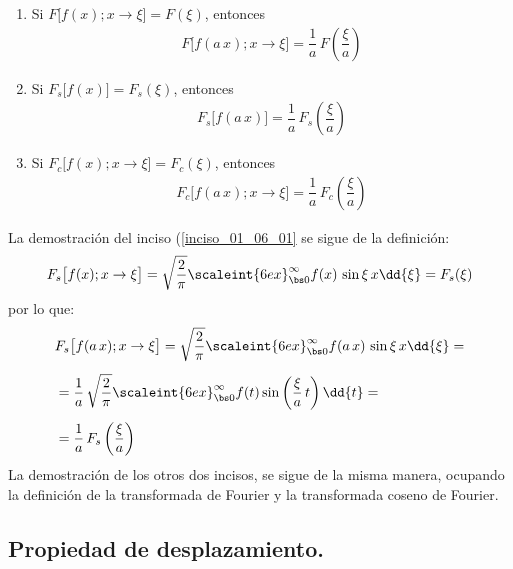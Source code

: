 \begin{enumerate}[\thesubsection .1)]
\item Si $F \big[ f(x); x \to \xi \big] = F(\xi)$, entonces
\begin{align*}
F \big[ f(a \, x); x \to \xi \big] = \dfrac{1}{a} \, F \left( \dfrac{\xi}{a} \right)
\end{align*}
\item \label{inciso_01_06_01} Si $F_{s} \big[ f(x) \big] = F_{s}(\xi)$, entonces
\begin{align*}
F_{s} \big[f(a \, x) \big] = \dfrac{1}{a} \, F_{s} \left( \dfrac{\xi}{a} \right)
\end{align*}
\item Si $F_{c} \big[ f(x); x \to \xi \big] = F_{c}(\xi)$, entonces
\begin{align*}
F_{c} \big[ f(a \, x); x \to \xi \big] = \dfrac{1}{a} \, F_{c} \left( \dfrac{\xi}{a} \right)
\end{align*}
\end{enumerate}
La demostración del inciso (\ref{inciso_01_06_01} se sigue de la definición:
\begin{align*}
F_{s} \big[ f(x); x \to \xi \big] = \sqrt{\dfrac{2}{\pi}} \scaleint{6ex}_{\bs 0}^{\infty} f(x) \, \sin \xi \, x \dd{\xi} = F_{s} (\xi)
\end{align*}
por lo que:
\begin{align*}
&F_{s} \big[ f(a \, x); x \to \xi \big] = \sqrt{\dfrac{2}{\pi}} \scaleint{6ex}_{\bs 0}^{\infty} f(a \, x) \, \sin \xi \, x \dd{\xi} = \\[0.5em]
&= \dfrac{1}{a} \, \sqrt{\dfrac{2}{\pi}} \scaleint{6ex}_{\bs 0}^{\infty} f(t) \sin \left( \dfrac{\xi}{a} \, t \right) \dd{t} = \\[0.5em]
&= \dfrac{1}{a} \, F_{s} \left( \dfrac{\xi}{a} \right)
\end{align*}
La demostración de los otros dos incisos, se sigue de la misma manera, ocupando la definición de la transformada de Fourier y la transformada coseno de Fourier.

\subsection{Propiedad de desplazamiento.}

